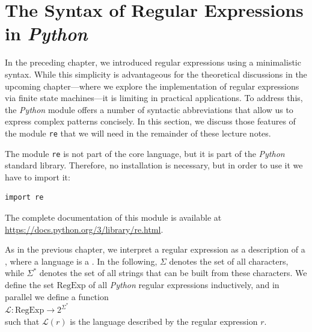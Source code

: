 \section{The Syntax of Regular Expressions in \textsl{Python} \label{section:python-regexp-syntax}}
In the preceding chapter, we introduced regular expressions using a minimalistic syntax.  While this simplicity
is advantageous for the theoretical discussions in the upcoming chapter---where we explore the implementation of
regular expressions via finite state machines---it is limiting in practical applications.  To address this, the
\textsl{Python} module  offers a number of
syntactic abbreviations that allow us to express complex patterns concisely.  In this section, we discuss those
features of the module \texttt{re} that we will need in the remainder of these lecture notes.

The module \texttt{re} is not part of the core language, but it is part of the \textsl{Python} standard library.
Therefore, no installation is necessary, but in order to use it we have to import it:

\begin{verbatim}
import re
\end{verbatim}

\noindent
The complete documentation of this module is available at
\href{https://docs.python.org/3/library/re.html}{https://docs.python.org/3/library/re.html}.

As in the previous chapter, we interpret a regular expression as a description of a , where a
language is a .  In the following, $\Sigma$ denotes the set of all 
characters, while $\Sigma^*$ denotes the set of all strings that can be built from these characters.  We define
the set $\textrm{RegExp}$ of all \textsl{Python} regular expressions inductively, and in parallel we define a
function
\\[0.2cm]
\hspace*{1.3cm}
$\mathcal{L}: \textrm{RegExp} \rightarrow 2^{\Sigma^*}$
\\[0.2cm]
such that $\mathcal{L}(r)$ is the language described by the regular expression $r$.

